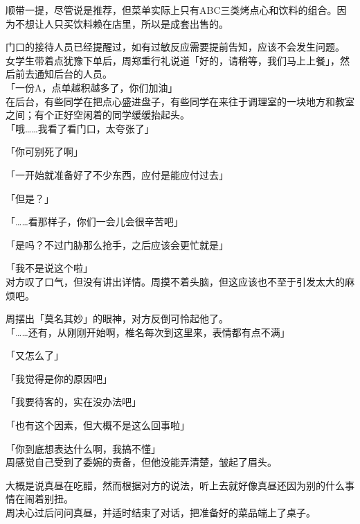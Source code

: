 顺带一提，尽管说是推荐，但菜单实际上只有ABC三类烤点心和饮料的组合。因为不想让人只买饮料赖在店里，所以是成套出售的。

门口的接待人员已经提醒过，如有过敏反应需要提前告知，应该不会发生问题。\\

女学生带着点犹豫下单后，周郑重行礼说道「好的，请稍等，我们马上上餐」，然后前去通知后台的人员。\\

「一份A，点单越积越多了，你们加油」\\

在后台，有些同学在把点心盛进盘子，有些同学在来往于调理室的一块地方和教室之间；有个正好空闲着的同学缓缓抬起头。\\

「哦……我看了看门口，太夸张了」

「你可别死了啊」

「一开始就准备好了不少东西，应付是能应付过去」

「但是？」

「……看那样子，你们一会儿会很辛苦吧」

「是吗？不过门胁那么抢手，之后应该会更忙就是」

「我不是说这个啦」\\

对方叹了口气，但没有讲出详情。周摸不着头脑，但这应该也不至于引发太大的麻烦吧。

周摆出「莫名其妙」的眼神，对方反倒可怜起他了。\\

「……还有，从刚刚开始啊，椎名每次到这里来，表情都有点不满」

「又怎么了」

「我觉得是你的原因吧」

「我要待客的，实在没办法吧」

「也有这个因素，但大概不是这么回事啦」

「你到底想表达什么啊，我搞不懂」\\

周感觉自己受到了委婉的责备，但他没能弄清楚，皱起了眉头。

大概是说真昼在吃醋，然而根据对方的说法，听上去就好像真昼还因为别的什么事情在闹着别扭。\\

周决心过后问问真昼，并适时结束了对话，把准备好的菜品端上了桌子。
